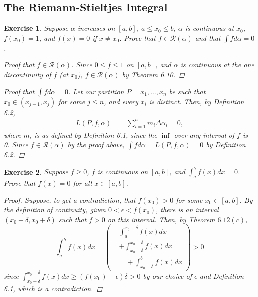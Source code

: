 \documentclass[10pt,letterpaper]{amsart}
\newtheorem{exercise}{Exercise}[section]
\theoremstyle{definition}
\theoremstyle{remark}
\numberwithin{equation}{exercise}
\begin{document}
\begin{multicols}{2}
  \section{The Riemann-Stieltjes Integral}
  \begin{exercise}\label{6.1}
    Suppose $\alpha$ increases on $[a,b]$, $a \le x_0 \le b$, $\alpha$ is continuous at $x_0$, $f(x_0) = 1$, and $f(x) = 0$ if $x \ne x_0$. Prove that $f \in \mathscr{R}(\alpha)$ and that $\int f d\alpha = 0$.
    \begin{proof}[Proof that $f \in \mathscr{R}(\alpha)$]
      Since $0 \le f \le 1$ on $[a,b]$, and $\alpha$ is continuous at the one discontinuity of $f$ (at $x_0$), $f \in \mathscr{R}(\alpha)$ by Theorem 6.10.
    \end{proof}
    \begin{proof}[Proof that $\int f d\alpha = 0$]
      Let our partition $P = {x_1,\ldots,x_n}$ be such that $x_0 \in (x_{j-1},x_j)$ for some $j \le n$, and every $x_i$ is distinct. Then, by Definition 6.2,
      \begin{align*}
        L(P,f,\alpha) &= \sum_{i=1}^n m_i \Delta \alpha_i = 0,
      \end{align*}
      where $m_i$ is as defined by Definition 6.1, since the $\inf$ over any interval of $f$ is 0. Since $f \in \mathscr{R}(\alpha)$ by the proof above, $\int f d\alpha = L(P,f,\alpha) = 0$ by Definition 6.2.
    \end{proof}
  \end{exercise}
  \begin{exercise}\label{6.2}
    Suppose $f \ge 0$, $f$ is continuous on $[a,b]$, and $\int_a^b f(x) dx = 0$. Prove that $f(x) = 0$ for all $x \in [a,b]$.
    \begin{proof}
      Suppose, to get a contradiction, that $f(x_0) > 0$ for some $x_0 \in [a,b]$. By the definition of continuity, given $0 < \epsilon < f(x_0)$, there is an interval $(x_0-\delta,x_0+\delta)$ such that $f > 0$ on this interval. Then, by Theorem $6.12(c)$,
      \begin{equation*}
        \int_a^b f(x) dx = \left(
        \begin{aligned}
          &\int_a^{x_0-\delta} f(x) dx\\
          &+ \int_{x_0-\delta}^{x_0+\delta} f(x) dx\\
          &\quad + \int_{x_0+\delta}^b f(x) dx
        \end{aligned} \right)
        > 0
      \end{equation*}
      since $\int_{x_0-\delta}^{x_0+\delta} f(x) dx \ge (f(x_0) - \epsilon)\delta > 0$ by our choice of $\epsilon$ and Definition 6.1, which is a contradiction.

\end{proof}
\end{exercise}
\end{multicols}
\end{document}
